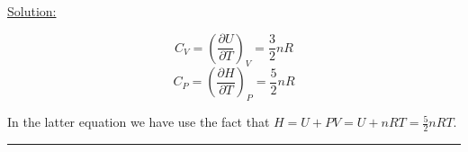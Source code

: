 \noindent
\underline{Solution:}

$$C_V = \left(\frac{\partial U}{\partial T}\right)_V = \frac{3}{2}nR$$
$$C_P = \left(\frac{\partial H}{\partial T}\right)_P = \frac{5}{2}nR$$

\noindent
In the latter equation we have use the fact that $H = U + PV = U + nRT = \frac{5}{2}nRT$.

\hrule\vspace{0.5cm}
